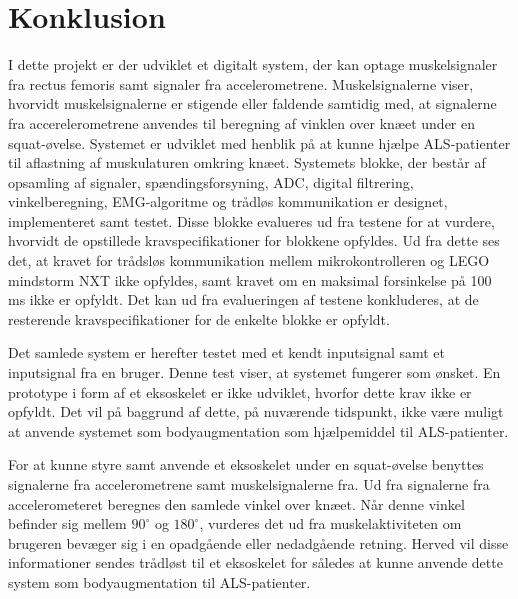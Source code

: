 \section{Konklusion}

I dette projekt er der udviklet et digitalt system, der kan optage muskelsignaler fra rectus femoris samt signaler fra accelerometrene. Muskelsignalerne viser, hvorvidt muskelsignalerne er stigende eller faldende samtidig med, at signalerne fra accerelerometrene anvendes til beregning af vinklen over knæet under en squat-øvelse. Systemet er udviklet med henblik på at kunne hjælpe ALS-patienter til aflastning af muskulaturen omkring knæet. Systemets blokke, der består af opsamling af signaler, spændingsforsyning, ADC, digital filtrering, vinkelberegning, EMG-algoritme og trådløs kommunikation er designet, implementeret samt testet. Disse blokke evalueres ud fra testene for at vurdere, hvorvidt de opstillede kravspecifikationer for blokkene opfyldes. Ud fra dette ses det, at kravet for trådsløs kommunikation mellem mikrokontrolleren og LEGO mindstorm NXT ikke opfyldes, samt kravet om en maksimal forsinkelse på 100 ms ikke er opfyldt. Det kan ud fra evalueringen af testene konkluderes, at de resterende kravspecifikationer for de enkelte blokke er opfyldt. 

Det samlede system er herefter testet med et kendt inputsignal samt et inputsignal fra en bruger. Denne test viser, at systemet fungerer som ønsket. En prototype i form af et eksoskelet er ikke udviklet, hvorfor dette krav ikke er opfyldt. Det vil på baggrund af dette, på nuværende tidspunkt, ikke være muligt at anvende systemet som bodyaugmentation som hjælpemiddel til ALS-patienter. 

For at kunne styre samt anvende et eksoskelet under en squat-øvelse benyttes signalerne fra accelerometrene samt muskelsignalerne fra. Ud fra signalerne fra accelerometeret beregnes den samlede vinkel over knæet. Når denne vinkel befinder sig mellem  $90^{\circ}$ og $180^{\circ}$, vurderes det ud fra muskelaktiviteten om brugeren bevæger sig i en opadgående eller nedadgående retning. Herved vil disse informationer sendes trådløst til et eksoskelet for således at kunne anvende dette system som bodyaugmentation til ALS-patienter.